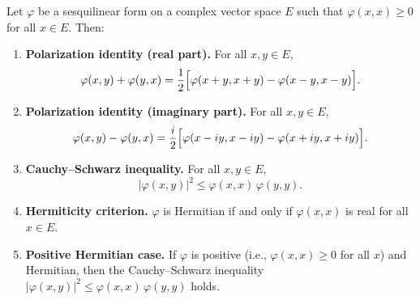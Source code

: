 Let $\varphi$ be a sesquilinear form on a complex vector space $E$ such that $\varphi(x, x) \geq 0$ for all $x \in E$. Then:

\begin{enumerate}
\item[(i)] \textbf{Polarization identity (real part).} For all $x, y \in E$,
$$\varphi(x, y) + \varphi(y, x) = \frac{1}{2}\Bigl[\varphi(x + y, x + y) - \varphi(x - y, x - y)\Bigr].$$

\item[(ii)] \textbf{Polarization identity (imaginary part).} For all $x, y \in E$,
$$\varphi(x, y) - \varphi(y, x) = \frac{i}{2}\Bigl[\varphi(x - iy, x - iy) - \varphi(x + iy, x + iy)\Bigr].$$

\item[(iii)] \textbf{Cauchy--Schwarz inequality.} For all $x, y \in E$,
$$|\varphi(x, y)|^2 \leq \varphi(x, x)\,\varphi(y, y).$$

\item[(iv)] \textbf{Hermiticity criterion.} $\varphi$ is Hermitian if and only if $\varphi(x, x)$ is real for all $x \in E$.

\item[(v)] \textbf{Positive Hermitian case.} If $\varphi$ is positive (i.e., $\varphi(x, x) \geq 0$ for all $x$) and Hermitian, then the Cauchy--Schwarz inequality $|\varphi(x, y)|^2 \leq \varphi(x, x)\,\varphi(y, y)$ holds.
\end{enumerate}
